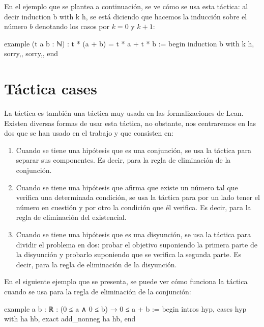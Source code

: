 En el ejemplo que se plantea a continuación, se ve cómo se usa esta táctica:
al decir induction b with k h, se está diciendo que hacemos la inducción sobre
el número \(b\) denotando los casos por \(k=0\) y \(k+1\):

\begin{leancode}
example (t a b : ℕ) : t * (a + b) = t * a + t * b :=
begin
  induction b with k h,
  {sorry,},
  {sorry,},
end
\end{leancode}

\section{Táctica cases}

La táctica  es también una táctica muy usada en las
formalizaciones de Lean. Existen diversas formas de usar esta táctica, no
obstante, nos centraremos en las dos que se han usado en el trabajo y que
consisten en:
\begin{enumerate}
\item Cuando se tiene una hipótesis que es una conjunción, se usa la
  táctica  para separar sus componentes. Es decir,
  para la regla de eliminación de la conjunción.

\item Cuando se tiene una hipótesis que afirma que existe un número tal que
  verifica una determinada condición, se usa la táctica 
  para por un lado tener el número en cuestión y por otro la condición que él
  verifica. Es decir, para la regla de eliminación del existencial.

\item Cuando se tiene una hipótesis que es una disyunción, se usa la táctica
   para dividir el problema en dos: probar el objetivo
  suponiendo la primera parte de la disyunción y probarlo suponiendo que
  se verifica la segunda parte. Es decir, para la regla de eliminación
  de la disyunción.
\end{enumerate}

En el siguiente ejemplo que se presenta, se puede ver cómo funciona la táctica
 cuando se usa para la regla de eliminación de la
conjunción:

\begin{leancode}
example {a b : ℝ} : (0 ≤ a ∧ 0 ≤ b) → 0 ≤ a + b :=
begin
  intros hyp,
  cases hyp with ha hb,
  exact add_nonneg ha hb,
end
\end{leancode}

